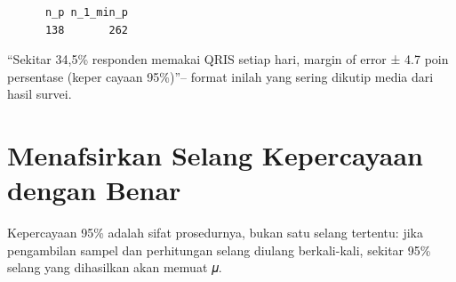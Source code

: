 \documentclass[
  indonesian,
  letterpaper,
]{book}
\begin{document}
\begin{verbatim}
      n_p n_1_min_p 
      138       262 
\end{verbatim}

``Sekitar 34,5\% responden memakai QRIS setiap hari, margin of error ±
4.7 poin persentase (keper cayaan 95\%)''-- format inilah yang sering
dikutip media dari hasil survei.

\section{Menafsirkan Selang Kepercayaan dengan
Benar}\label{menafsirkan-selang-kepercayaan-dengan-benar}

Kepercayaan 95\% adalah sifat prosedurnya, bukan satu selang tertentu:
jika pengambilan sampel dan perhitungan selang diulang berkali-kali,
sekitar 95\% selang yang dihasilkan akan memuat 𝜇.
\end{document}
